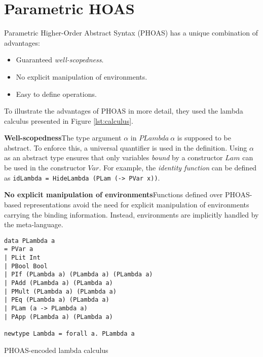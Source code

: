 \section{Parametric HOAS}\label{sec:phoas}

Parametric Higher-Order Abstract Syntax (PHOAS) has a unique combination of advantages:

\begin{itemize}
  \item Guaranteed \textit{well-scopedness}.
  \item No explicit manipulation of environments.
  \item Easy to define operations.
\end{itemize}

To illustrate the advantages of PHOAS in more detail, they used the lambda calculus presented in Figure \ref{lst:calculus}.

\textbf{Well-scopedness}\quad The type argument $\alpha$ in $PLambda \ \alpha$ is supposed to be abstract. To enforce this, a universal quantifier is used in the definition. Using $\alpha$ as an abstract type ensures that only variables \textit{bound} by a constructor $Lam$ can be used in the constructor $Var$. For example, the \textit{identity function} can be defined as \texttt{idLambda = HideLambda (PLam (\x -> PVar x))}.

\textbf{No explicit manipulation of environments}\quad Functions defined over PHOAS-based representations avoid the need for explicit manipulation of environments carrying the binding information. Instead, environments are implicitly handled by the meta-language. %

\begin{listing}[H]
  \begin{verbatim}
data PLambda a
= PVar a
| PLit Int
| PBool Bool
| PIf (PLambda a) (PLambda a) (PLambda a)
| PAdd (PLambda a) (PLambda a)
| PMult (PLambda a) (PLambda a)
| PEq (PLambda a) (PLambda a)
| PLam (a -> PLambda a)
| PApp (PLambda a) (PLambda a)

newtype Lambda = forall a. PLambda a
  \end{verbatim}
  \caption{PHOAS-encoded lambda calculus}
  \label{lst:calculus}
\end{listing}


